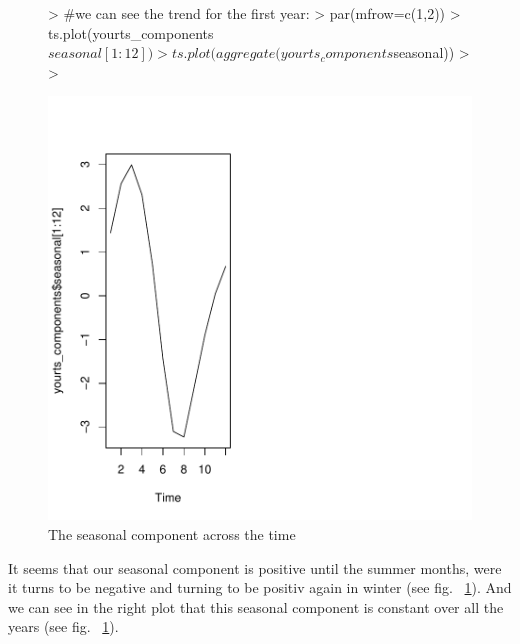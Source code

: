 \documentclass[11pt, a4paper]{article} %
\begin{document}
\begin{figure}[H]
\centering
\begin{Schunk}
\begin{Sinput}
> #we can see the trend for the first year:
> par(mfrow=c(1,2))
> ts.plot(yourts_components$seasonal[1:12])
> ts.plot(aggregate(yourts_components$seasonal))
> 
> 
\end{Sinput}
\end{Schunk}
\includegraphics{sweaveclean-decomposition}
\caption{The seasonal component across the time}
\label{decomposition}
\end{figure}

It seems that our seasonal component is positive until the summer months, were it turns to be negative and turning to be positiv again in winter (see fig. ~\ref{decomposition}). And we can see in the right plot that this seasonal component is constant over all the years (see fig. ~\ref{decomposition}).
\end{document}
